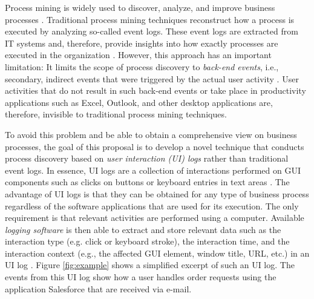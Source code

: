 Process mining is widely used to discover, analyze, and improve business processes \cite{van2016data}. Traditional process mining techniques reconstruct how a process is executed by analyzing so-called event logs. These event logs are extracted from IT systems and, therefore, provide insights into how exactly processes are executed in the organization . However, this approach has an important limitation: It limits the scope of process discovery to \textit{back-end events}, i.e., secondary, indirect events that were triggered by the actual user activity \cite{diba2020extraction}. User activities that do not result in such back-end events or take place in productivity applications such as Excel, Outlook, and other desktop applications are, therefore, invisible to traditional process mining techniques. 

To avoid this problem and be able to obtain a comprehensive view on business processes, the goal of this proposal is to develop a novel technique that conducts process discovery based on \textit{user interaction (UI) logs} rather than traditional event logs. In essence, UI logs are a collection of interactions performed on GUI components such as clicks on buttons or keyboard entries in text areas \cite{Urabe21}. The advantage of UI logs is that they can be obtained for any type of business process regardless of the software applications that are used for its execution. The only requirement is that relevant activities are performed using a computer. Available \textit{logging software} is then able to extract and store relevant data such as the interaction type (e.g. click or keyboard stroke), the interaction time, and the interaction context (e.g., the affected GUI element, window title, URL, etc.) in an UI log  \cite{leno2019action}. Figure \ref{fig:example} shows a simplified excerpt of such an UI log. The events from this UI log show how a user handles order requests using the application Salesforce that are received via e-mail. 

